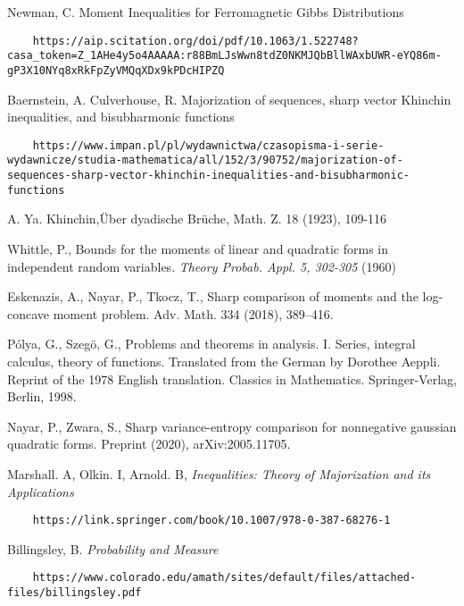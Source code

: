 \documentclass[10pt]{article}
\newcommand{\1}{\textbf{1}}
\theoremstyle{remark}
\theoremstyle{definition}
\begin{document}
\begin{thebibliography}{9}
 Newman, C. Moment Inequalities for Ferromagnetic Gibbs Distributions

\begin{verbatim}
	https://aip.scitation.org/doi/pdf/10.1063/1.522748?casa_token=Z_1AHe4y5o4AAAAA:r88BmLJsWwn8tdZ0NKMJQbBllWAxbUWR-eYQ86m-gP3X10NYq8xRkFpZyVMQqXDx9kPDcHIPZQ
\end{verbatim}

 Baernstein, A. Culverhouse, R. Majorization of sequences, sharp vector Khinchin inequalities, and bisubharmonic functions

\begin{verbatim}
	https://www.impan.pl/pl/wydawnictwa/czasopisma-i-serie-wydawnicze/studia-mathematica/all/152/3/90752/majorization-of-sequences-sharp-vector-khinchin-inequalities-and-bisubharmonic-functions
\end{verbatim}

 A. Ya. Khinchin,{\"U}ber dyadische Br{\"u}che, Math. Z. 18 (1923), 109-116

 Whittle, P., Bounds for the moments of linear and quadratic forms in independent random variables. \textit{Theory Probab. Appl. 5, 302-305} (1960)

Eskenazis, A., Nayar, P., Tkocz, T., Sharp comparison of moments and the log-concave moment problem. Adv. Math. 334 (2018), 389--416.

P\'olya, G., Szeg\"o, G., 
Problems and theorems in analysis. I. Series, integral calculus, theory of functions. Translated from the German by Dorothee Aeppli. Reprint of the 1978 English translation. Classics in Mathematics. Springer-Verlag, Berlin, 1998.

Nayar, P., Zwara, S.,
Sharp variance-entropy comparison for nonnegative gaussian quadratic forms. Preprint (2020), arXiv:2005.11705.


 Marshall. A, Olkin. I, Arnold. B, \textit{Inequalities: Theory of Majorization and its Applications}

\begin{verbatim}
	https://link.springer.com/book/10.1007/978-0-387-68276-1
\end{verbatim}

 Billingsley, B. \textit{Probability and Measure} 

\begin{verbatim}
	https://www.colorado.edu/amath/sites/default/files/attached-files/billingsley.pdf
\end{verbatim}

\end{thebibliography}
\end{document}
